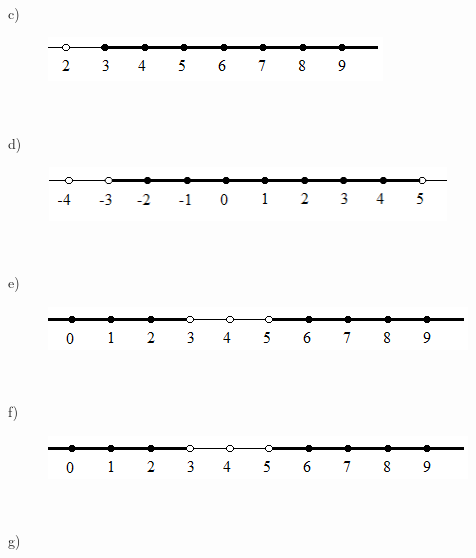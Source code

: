 \begin{respostas}{5}
~~

 c)

\begin{figure}[H]
	\begin{Center}
		\includegraphics[width=3.49in,height=0.46in]{capitulos/conjuntos_numericos/media/image19.png}
	\end{Center}
\end{figure}

~~

d)

\begin{figure}[H]
	\begin{Center}
		\includegraphics[width=4.17in,height=0.56in]{capitulos/conjuntos_numericos/media/image20.png}
	\end{Center}
\end{figure}

~~

 e)

\begin{figure}[H]
	\begin{Center}
		\includegraphics[width=4.38in,height=0.45in]{capitulos/conjuntos_numericos/media/image21.png}
	\end{Center}
\end{figure}

~~

 f)

\begin{figure}[H]
	\begin{Center}
		\includegraphics[width=4.38in,height=0.45in]{capitulos/conjuntos_numericos/media/image21.png}
	\end{Center}
\end{figure}

~~

 g)


\end{respostas}
